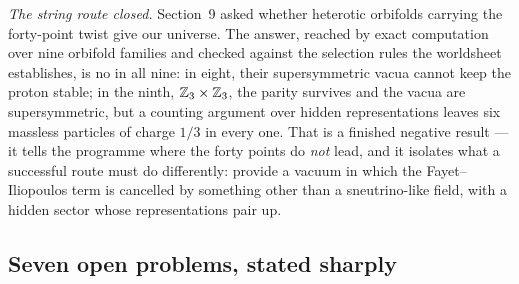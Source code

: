 \emph{The string route closed.} Section~9 asked whether heterotic orbifolds carrying the forty-point twist
give our universe. The answer, reached by exact computation over nine orbifold families and checked
against the selection rules the worldsheet establishes, is no in all nine: in eight, their supersymmetric vacua
cannot keep the proton stable; in the ninth, $\mathbb{Z}_3\times\mathbb{Z}_3$, the parity survives and the vacua are
supersymmetric, but a counting argument over hidden representations leaves six massless particles of charge
$1/3$ in every one. That is a finished negative result --- it tells the programme where the forty points do
\emph{not} lead, and it isolates what a successful route must do differently: provide a vacuum in which the
Fayet--Iliopoulos term is cancelled by something other than a sneutrino-like field, with a hidden sector whose
representations pair up.

\subsection{Seven open problems, stated sharply}

